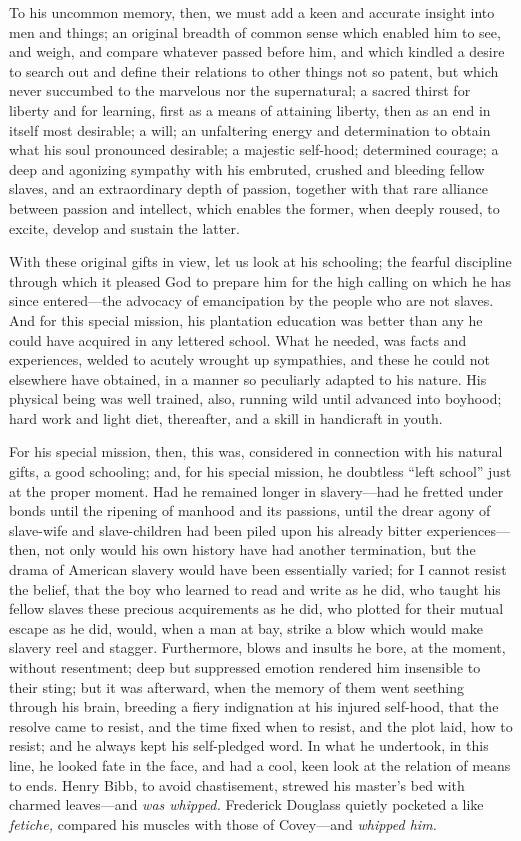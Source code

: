 To his uncommon memory, then, we must add a keen and accurate insight
into men and things; an original breadth of common sense which enabled
him to see, and weigh, and compare whatever passed before him, and which
kindled a desire to search out and define their relations to other
things not so patent, but which never {}succumbed to the marvelous nor
the supernatural; a sacred thirst for liberty and for learning, first as
a means of attaining liberty, then as an end in itself most desirable; a
will; an unfaltering energy and determination to obtain what his soul
pronounced desirable; a majestic self-hood; determined courage; a deep
and agonizing sympathy with his embruted, crushed and bleeding fellow
slaves, and an extraordinary depth of passion, together with that rare
alliance between passion and intellect, which enables the former, when
deeply roused, to excite, develop and sustain the latter.

With these original gifts in view, let us look at his schooling; the
fearful discipline through which it pleased God to prepare him for the
high calling on which he has since entered---the advocacy of
emancipation by the people who are not slaves. And for this special
mission, his plantation education was better than any he could have
acquired in any lettered school. What he needed, was facts and
experiences, welded to acutely wrought up sympathies, and these he could
not elsewhere have obtained, in a manner so peculiarly adapted to his
nature. His physical being was well trained, also, running wild until
advanced into boyhood; hard work and light diet, thereafter, and a skill
in handicraft in youth.

For his special mission, then, this was, considered in connection with
his natural gifts, a good schooling; and, for his special mission, he
doubtless ``left school'' just at the proper moment. Had he remained
longer in slavery---had he fretted under bonds until the ripening of
manhood and its passions, until the drear agony of slave-wife and
slave-children had been piled upon his already bitter
experiences---then, not only would his own history have had another
termination, but the drama of American slavery would have been
essentially varied; for I cannot resist the belief, that the boy who
learned to read and write as he did, who taught his fellow slaves these
precious acquirements as he did, who plotted for their mutual escape as
he did, would, when a man at bay, strike a blow which would make slavery
reel and stagger. Furthermore, blows and insults he bore, at the moment,
without resentment; deep but suppressed emotion rendered him insensible
to their sting; but it was afterward, when the memory of them went
seething through his brain, breeding a fiery indignation at his injured
self-hood, that the resolve came to resist, and the time fixed when to
resist, and {}the plot laid, how to resist; and he always kept his
self-pledged word. In what he undertook, in this line, he looked fate in
the face, and had a cool, keen look at the relation of means to ends.
Henry Bibb, to avoid chastisement, strewed his master's bed with charmed
leaves---and \emph{was whipped.} Frederick Douglass quietly pocketed a
like \emph{fetiche,} compared his muscles with those of Covey---and
\emph{whipped him.}

